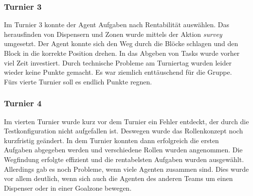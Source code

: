 %
%

\subsubsection{Turnier 3}
Im Turnier 3 konnte der Agent Aufgaben nach Rentabilität auswählen. Das herausfinden von Dispensern und Zonen wurde mittels der Aktion \emph{survey} umgesetzt. Der Agent konnte sich den Weg durch die Blöcke schlagen und den Block in die korrekte Position drehen. In das Abgeben von Tasks wurde vorher viel Zeit investiert. Durch technische Probleme am Turniertag wurden leider wieder keine Punkte gemacht. Es war ziemlich enttäuschend für die Gruppe.\\
Fürs vierte Turnier soll es endlich Punkte regnen.

%
%

\subsubsection{Turnier 4}
Im vierten Turnier wurde kurz vor dem Turnier ein Fehler entdeckt, der durch die Testkonfiguration nicht aufgefallen ist. Deswegen wurde das Rollenkonzept noch kurzfristig geändert. In dem Turnier konnten dann erfolgreich die ersten Aufgaben abgegeben werden und verschiedene Rollen wurden angenommen. Die Wegfindung erfolgte effizient und die rentabelsten Aufgaben wurden ausgewählt. Allerdings gab es noch Probleme, wenn viele Agenten zusammen sind. Dies wurde vor allem deutlich, wenn sich auch die Agenten des anderen Teams um einen Dispenser oder in einer Goalzone bewegen.

